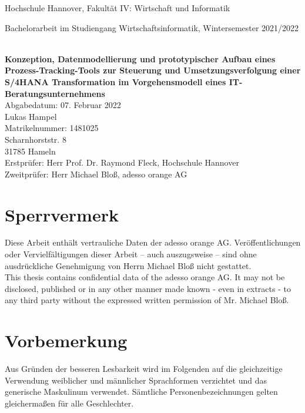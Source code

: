 \newpage\null\thispagestyle{empty}\newpage

\begin{titlepage}
    \normalsize{Hochschule Hannover, Fakultät IV: Wirtschaft und Informatik

    Bachelorarbeit im Studiengang Wirtschaftsinformatik, Wintersemester 2021/2022} 
    
    \sloppy 
    \textbf{\Large{\\Konzeption, Datenmodellierung und prototypischer Aufbau eines Prozess-Tracking-Tools zur Steuerung und Umsetzungsverfolgung einer S/4HANA Transformation im Vorgehensmodell eines IT-Beratungsunternehmens}}
    \vspace{10cm}
    \normalsize{\\Abgabedatum: 07. Februar 2022 \vspace{1cm}\\Lukas Hampel\\Matrikelnummer: 1481025\\Scharnhorststr. 8\\31785 Hameln\vspace{1cm}\\Erstprüfer: Herr Prof. Dr. Raymond Fleck, Hochschule Hannover\\Zweitprüfer: Herr Michael Bloß, adesso orange AG}
\end{titlepage}


\section*{Sperrvermerk}
Diese Arbeit enthält vertrauliche Daten der adesso orange AG. Veröffentlichungen oder Vervielfältigungen dieser Arbeit – auch auszugsweise – sind ohne ausdrückliche Genehmigung von Herrn Michael Bloß nicht gestattet.
\vspace{1cm}
\\This thesis contains confidential data of the adesso orange AG. It may not be disclosed, published or in any other manner made known - even in extracts - to any third party without the expressed written permission of Mr. Michael Bloß.
\newpage


\setcounter{page}{3}
\section*{Vorbemerkung}
Aus Gründen der besseren Lesbarkeit wird im Folgenden auf die gleichzeitige Verwendung weiblicher und männlicher Sprachformen verzichtet und das generische Maskulinum verwendet. Sämtliche Personenbezeichnungen gelten gleichermaßen für alle Geschlechter.


